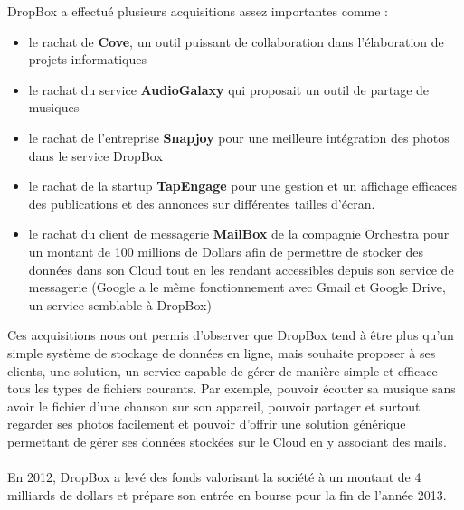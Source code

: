 \documentclass[a4paper, 10pt]{article}
\begin{document}
\newpage
\noindent
DropBox a effectu\'e plusieurs acquisitions assez importantes comme :
\begin{itemize}
 \item le rachat de \textbf{Cove}, un outil puissant de collaboration dans l'\'elaboration de projets informatiques
 \item le rachat du service \textbf{AudioGalaxy} qui proposait un outil de partage de musiques
 \item le rachat de l'entreprise \textbf{Snapjoy} pour une meilleure int\'egration des photos dans le service DropBox
 \item le rachat de la startup \textbf{TapEngage} pour une gestion et un affichage efficaces des publications et des annonces
sur diff\'erentes tailles d'\'ecran.
 \item le rachat du client de messagerie \textbf{MailBox} de la compagnie Orchestra pour un montant de 100 millions de Dollars
afin de permettre de stocker des donn\'ees dans son Cloud tout en les rendant accessibles depuis son service de messagerie
(Google a le m\^eme fonctionnement avec Gmail et Google Drive, un service semblable \`a DropBox)
\end{itemize}
Ces acquisitions nous ont permis d'observer que DropBox tend \`a \^etre plus qu'un simple syst\`eme de stockage de donn\'ees en ligne,
mais souhaite proposer \`a ses clients, une solution, un service capable de g\'erer de mani\`ere simple et efficace
tous les types de fichiers courants.
Par exemple, pouvoir \'ecouter sa musique sans avoir le fichier d'une chanson sur son appareil,
pouvoir partager et surtout regarder ses photos facilement et
pouvoir d'offrir une solution g\'en\'erique permettant de g\'erer ses donn\'ees stock\'ees sur le Cloud en y associant des mails.\\ \\
En 2012, DropBox a lev\'e des fonds valorisant la soci\'et\'e \`a un montant de 4 milliards de dollars et
pr\'epare son entr\'ee en bourse pour la fin de l'ann\'ee 2013.
\end{document}
